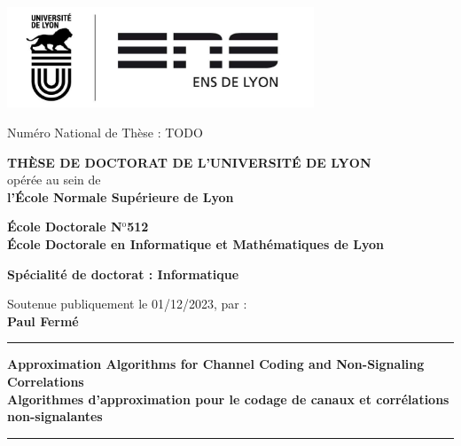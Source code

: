 \documentclass[11pt,a4paper]{book}
\begin{document}
\setlength{\parindent}{0pt}
\thispagestyle{empty}


\begin{center}
\includegraphics[height=3cm]{logo} %
\end{center}


\fontsize{11pt}{13pt}\selectfont
Numéro National de Thèse : TODO

\vspace{1cm}

\begin{center}
\fontsize{14pt}{16pt}\selectfont
\textbf{\uppercase{Thèse de doctorat de l'université de Lyon}}\\
\fontsize{12pt}{14pt}\selectfont
opérée au sein de\\
\textbf{l'École Normale Supérieure de Lyon}

\vspace{0.5cm}

\textbf{École Doctorale N$^{\mathrm{o}}$512\\%
École Doctorale en Informatique et Mathématiques de Lyon}%

\vspace{0.5cm}

\textbf{Spécialité de doctorat : Informatique\\
}


\vspace{1.5cm}

Soutenue publiquement le 01/12/2023, par :\\
\fontsize{14pt}{16pt}\selectfont
\textbf{Paul Fermé}

\vspace{1.5cm} %

\rule[20pt]{\textwidth}{0.5pt}

\fontsize{25pt}{28pt}\selectfont
\textbf{Approximation Algorithms for Channel Coding and Non-Signaling Correlations}\\[.5em]
\fontsize{18pt}{21pt}\selectfont
\textbf{Algorithmes d'approximation pour le codage de canaux et corrélations non-signalantes}

\rule{\textwidth}{0.5pt}

\vspace{1cm} %
\end{center}
\end{document}
